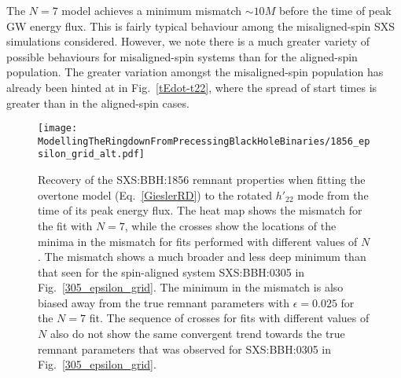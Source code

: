 The $N=7$ model achieves a minimum mismatch $\sim 10M$ before the time of peak GW energy flux. This is fairly typical behaviour among the misaligned-spin SXS simulations considered.
However, we note there is a much greater variety of possible behaviours for misaligned-spin systems than for the aligned-spin population. 
The greater variation amongst the misaligned-spin population has already been hinted at in Fig.~\ref{tEdot-t22}, where the spread of start times is greater than in the aligned-spin cases.

\begin{figure}[t]
    \centering
    \texttt{[image: ModellingTheRingdownFromPrecessingBlackHoleBinaries/1856\_epsilon\_grid\_alt.pdf]}
    \caption[Recovery of the SXS:BBH:1856 remnant properties using an overtone model starting from the peak of the GW energy flux]{
    Recovery of the SXS:BBH:1856 remnant properties when fitting the overtone model (Eq.~\ref{GieslerRD}) to the rotated $h'_{22}$ mode from the time of its peak energy flux.
    The heat map shows the mismatch for the fit with $N=7$, while the crosses show the locations of the minima in the mismatch for fits performed with different values of $N$.
    The mismatch shows a much broader and less deep minimum than that seen for the spin-aligned system SXS:BBH:0305 in Fig.~\ref{305_epsilon_grid}.
    The minimum in the mismatch is also biased away from the true remnant parameters with $\epsilon=0.025$ for the $N=7$ fit.
    The sequence of crosses for fits with different values of $N$ also do not show the same convergent trend towards the true remnant parameters that was observed for SXS:BBH:0305 in Fig.~\ref{305_epsilon_grid}.
    }
    \label{1856_epsilon_grid}
\end{figure}

